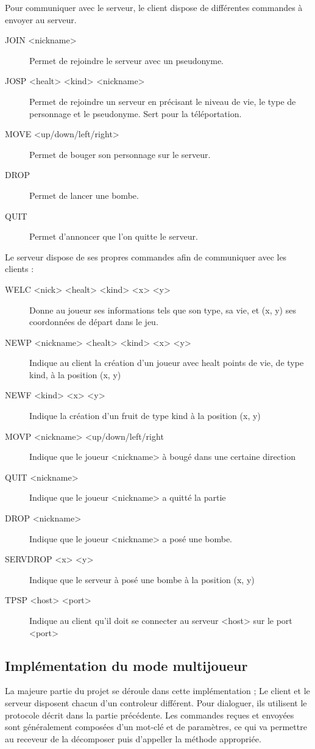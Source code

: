 \documentclass[12pt]{article}
\begin{document}
\newpage
Pour communiquer avec le serveur, le client dispose de différentes commandes à envoyer au serveur.\\
\begin{description}
\item[JOIN <nickname>] Permet de rejoindre le serveur avec un pseudonyme.
\item[JOSP <healt> <kind> <nickname>] Permet de rejoindre un serveur en précisant le niveau de vie, le type de personnage et le pseudonyme. Sert pour la téléportation.
\item[MOVE <up/down/left/right>] Permet de bouger son personnage sur le serveur.
\item[DROP] Permet de lancer une bombe.
\item[QUIT] Permet d'annoncer que l'on quitte le serveur.
\end{description}
Le serveur dispose de ses propres commandes afin de communiquer avec les clients :\\
\begin{description}
\item[WELC <nick> <healt> <kind> <x> <y>] Donne au joueur ses informations tels que son type, sa vie, et (x, y) ses coordonnées de départ dans le jeu.
\item[NEWP <nickname> <healt> <kind> <x> <y>] Indique au client la création d'un joueur avec healt points de vie, de type kind, à la position (x, y)
\item[NEWF <kind> <x> <y>] Indique la création d'un fruit de type kind à la position (x, y)
\item[MOVP <nickname> <up/down/left/right] Indique que le joueur <nickname> à bougé dans une certaine direction
\item[QUIT <nickname>] Indique que le joueur <nickname> a quitté la partie
\item[DROP <nickname>] Indique que le joueur <nickname> a posé une bombe.
\item[SERVDROP <x> <y>] Indique que le serveur à posé une bombe à la position (x, y)
\item[TPSP <host> <port>] Indique au client qu'il doit se connecter au serveur <host> sur le port <port>
\end{description}
\newpage
\subsection{Implémentation du mode multijoueur}

La majeure partie du projet se déroule dans cette implémentation ; Le client et le serveur disposent chacun d'un controleur différent. Pour dialoguer, ils utilisent le protocole décrit dans la partie précédente. Les commandes reçues et envoyées sont généralement composées d'un mot-clé et de paramètres, ce qui va permettre au receveur de la décomposer puis d'appeller la méthode appropriée.
\\
\end{document}
